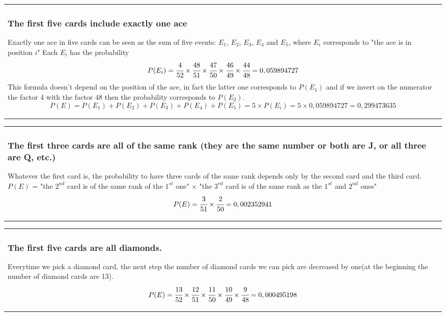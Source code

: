 \documentclass[oneside]{article}			%
\newenvironment{adjustwidth}{\begin{center}\begin{tabular}{p{0.9\textwidth}}   }{\end{tabular} \end{center}}		%
\begin{document}
	\begin{adjustwidth}
	\subsubsection{The first five cards include exactly one ace}
	Exactly one ace in five cards can be seen as the sum of five events: $E_1$, $E_2$, $E_3$, $E_4$ and $E_5$, where $E_i$ corresponds to "the ace is in position $i$"
	\newline Each $E_i$ has the probability \[P(E_i) = \cfrac{4}{52} \times \cfrac{48}{51} \times \cfrac{47}{50} \times \cfrac{46}{49} \times \cfrac{44}{48} = 0,059894727 \]
	\newline This formula doesn't depend on the position of the ace, in fact the latter one corresponds to $P(E_1)$ and if we invert on the numerator the factor 4 with the factor 48 then the probability corresponds to $P(E_2)$.
	\[P(E) = P(E_1) + P(E_2) + P(E_3) + P(E_4) + P(E_5) = 5 \times P(E_i) = 5 \times 0,059894727 = 0,299473635 \]
	\end{adjustwidth}

	\begin{adjustwidth}
	\subsubsection{The first three cards are all of the same rank (they are the same number or both are J, or all three are Q, etc.)}
	Whatever the first card is, the probability to have three cards of the same rank depends only by the second card and the third card.
	\newline $P(E)$ = "the $2^{nd}$ card is of the same rank of the $1^{st}$ one" $\times$ "the $3^{rd}$ card is of the same rank as the $1^{st}$ and $2^{nd}$ ones"
	\[P(E) = \cfrac{3}{51} \times \cfrac{2}{50} = 0,002352941 \]
	\end{adjustwidth}

	\begin{adjustwidth}
	\subsubsection{The first five cards are all diamonds.}
	Everytime we pick a diamond card, the next step the number of diamond cards we can pick are decreased by one(at the beginning the number of diamond cards are 13).
	\[P(E) = \cfrac{13}{52} \times \cfrac{12}{51} \times \cfrac{11}{50} \times \cfrac{10}{49} \times \cfrac{9}{48} = 0,000495198\]
	\end{adjustwidth}
\end{document}
